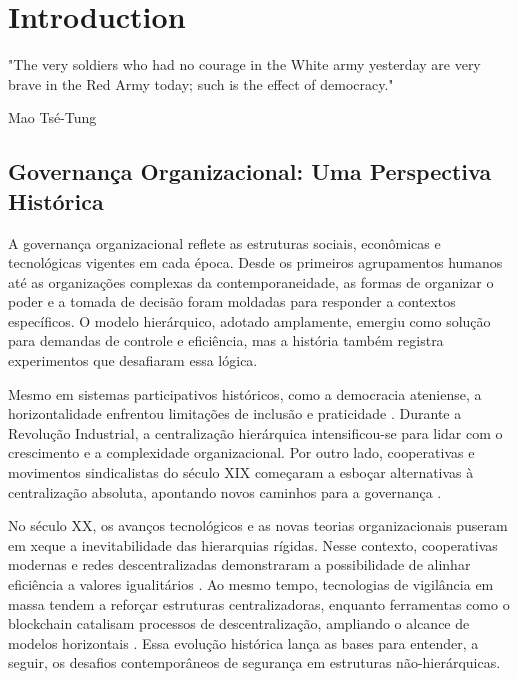 
%

\chapter{Introduction}
\label{cha:Introduction}


\epigraphfontsize{\small\itshape}
\setlength\epigraphwidth{12.5cm}
\setlength\epigraphrule{0pt}

\epigraph{
    "The very soldiers who had no courage in the White army yesterday are
    very brave in the Red Army today; such is the effect of democracy."
} {Mao Tsé-Tung}


\section{Governança Organizacional: Uma Perspectiva
Histórica} \label{sec:contexto_historico}

A governança organizacional reflete as estruturas sociais,
econômicas e tecnológicas vigentes em cada época. Desde os
primeiros agrupamentos humanos até as organizações complexas
da contemporaneidade, as formas de organizar o poder e a
tomada de decisão foram moldadas para responder a contextos
específicos. O modelo hierárquico, adotado amplamente,
emergiu como solução para demandas de controle e eficiência,
mas a história também registra experimentos que desafiaram
essa lógica.

Mesmo em sistemas participativos históricos, como a
democracia ateniense, a horizontalidade enfrentou limitações
de inclusão e praticidade \cite{AthenianDemocracyABrief}.
Durante a Revolução Industrial, a centralização hierárquica
intensificou-se para lidar com o crescimento e a
complexidade organizacional. Por outro lado, cooperativas e
movimentos sindicalistas do século XIX começaram a esboçar
alternativas à centralização absoluta, apontando novos
caminhos para a governança
\cite{WorkerCooperativesinAmerica, EverydayRevolutions}.

No século XX, os avanços tecnológicos e as novas teorias
organizacionais puseram em xeque a inevitabilidade das
hierarquias rígidas. Nesse contexto, cooperativas modernas e
redes descentralizadas demonstraram a possibilidade de
alinhar eficiência a valores igualitários
\cite{WorkerCooperativesandRevolution}. Ao mesmo tempo,
tecnologias de vigilância em massa tendem a reforçar
estruturas centralizadoras, enquanto ferramentas como o
blockchain catalisam processos de descentralização,
ampliando o alcance de modelos horizontais
\cite{DoArtifactsHavePolitics}. Essa evolução histórica
lança as bases para entender, a seguir, os desafios
contemporâneos de segurança em estruturas não-hierárquicas.

